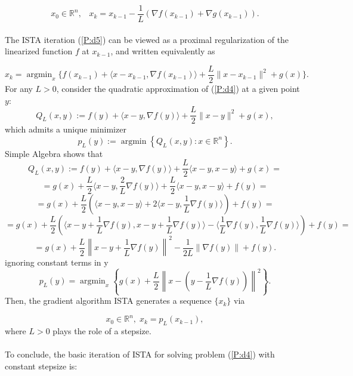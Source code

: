 \documentclass[12pt]{article}
\DeclareMathOperator*{\argmin}{argmin} %
\begin{document}
\begin{equation}\label{P:d5}
x_0 \in \mathbb{R}^n, \;\;\; x_k = x_{k-1} -\frac{1}{L}(\nabla f(x_{k-1})+\nabla g(x_{k-1})).
\end{equation}
\\The ISTA iteration (\ref{P:d5}) can be viewed as a proximal regularization of the linearized function $f$ at $x_{k-1}$, and written equivalently as

$$x_k = \argmin_x \{f(x_{k-1}) +\langle x-x_{k-1}, \nabla f(x_{k-1}) \rangle +\frac{L}{2} \|x-x_{k-1}\|^2 + g(x)\} .$$ 
For any $L > 0$, consider the quadratic approximation of (\ref{P:d4}) at a given point $y$:
$$Q_L (x,y) := f(y) + \langle x-y, \nabla f(y)\rangle + \frac{L}{2} \|x-y\|^2 + g(x),$$
which admits a unique minimizer
$$p_L(y) := \argmin \left\{Q_L(x,y) :x \in \mathbb{R}^n\right\}.$$
Simple Algebra shows that 
$$Q_L (x,y) := f(y) + \langle x-y, \nabla f(y)\rangle + \frac{L}{2} \langle x-y,x-y \rangle + g(x) =$$
$$= g(x) + \frac{L}{2} \langle x-y, \frac{2}{L} \nabla f(y)\rangle + \frac{L}{2} \langle x-y,x-y \rangle + f(y) =$$
$$= g(x) + \frac{L}{2} \left( \langle x-y,x-y \rangle + 2 \langle x-y, \frac{1}{L} \nabla f(y)\rangle  \right) + f(y) =$$
$$= g(x) + \frac{L}{2} \left(\langle x-y + \frac{1}{L}\nabla f(y), x-y + \frac{1}{L}\nabla f(y)\rangle -  \langle \frac{1}{L}\nabla f(y),\frac{1}{L}\nabla f(y) \rangle \right) + f(y) =$$
$$= g(x) + \frac{L}{2} \left \|x-y + \frac{1}{L}\nabla f(y)\right\|^2 - \frac{1}{2L} \left\|\nabla f(y)\right\| + f(y).$$
ignoring constant terms in y
$$p_L (y) = \argmin_{x} \left\{g(x) + \frac{L}{2} \left\| x-\left(y-\frac{1}{L}\nabla f(y)\right)\right\|^2\right\}.$$
Then, the gradient algorithm ISTA generates a sequence $\{x_k\}$ via

$$ x_0 \in \mathbb{R}^n,\; x_k =p_L(x_{k-1}),$$
where $L>0$ plays the role of a stepsize.\\
\\To conclude,  the basic iteration of ISTA for solving problem (\ref{P:d4}) with constant stepsize is:\\
\\
\end{document}

